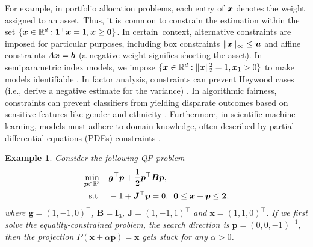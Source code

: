 \documentclass[aos]{imsart}
\numberwithin{equation}{section}
\theoremstyle{plain}
\newtheorem{example}{Example}
\begin{document}
For example, in portfolio allocation problems, each entry of ${\boldsymbol{x}}$ denotes the weight assigned to an asset. Thus, it is~common to constrain the estimation within the set $\{{\boldsymbol{x}}\in\mathbb{R}^d: {\boldsymbol{1}}^\top {\boldsymbol{x}} = 1, {\boldsymbol{x}}\geq {\boldsymbol 0}\}$. In certain~context, alternative constraints are imposed for particular purposes, including box constraints $\|{\boldsymbol{x}}\|_{\infty}\leq {\boldsymbol{u}}$ and affine constraints $A{\boldsymbol{x}} = {\boldsymbol{b}}$ \cite{Fan2007Variable, Fan2012Vast} (a negative weight signifies shorting the asset). In semiparametric index models, we impose $\{{\boldsymbol{x}}\in\mathbb{R}^d: \|{\boldsymbol{x}}\|_2^2=1, {\boldsymbol{x}}_1>0\}$ to make models identifiable \cite{Na2019High, Na2021High}. In factor analysis, constraints can prevent Heywood cases (i.e., derive a negative estimate for the variance) \cite{Shapiro1985Asymptotic}. In algorithmic fairness, constraints can prevent classifiers from yielding disparate outcomes based on sensitive features like gender and ethnicity \cite{Zafar2019Fairness}. Furthermore, in scientific machine learning, models must adhere to domain knowledge, often described by partial differential equations (PDEs) constraints \cite{Cuomo2022Scientific}.





\begin{example}
    Consider the following QP problem
    \begin{equation*}
        \begin{split}
            \min_{\bm{p} \in \mathbb{R}^{3}} & \hspace{1em} \bm{g}^{\top} \bm{p} + \frac{1}{2} \bm{p}^{\top} \bm{B} \bm{p},\\
            \text{s.t.} & \hspace{1em} -1 + \bm{J}^{\top} \bm{p} = 0, \hspace{0.5em} \bm{0} \leq \bm{x} + \bm{p} \leq \bm{2},
        \end{split}
    \end{equation*}
    where $\bm{g} = (1,-1,0)^{\top}$, $\bm{B} = \bm{I}_3$, $\bm{J} = (1,-1,1)^{\top}$ and $\bm{x} = (1, 1, 0)^{\top}$. If we first solve the equality-constrained problem, the search direction is $\bm{p} = (0,0,-1)^{-1}$, then the projection $P(\bm{x}+\alpha \bm{p}) = \bm{x}$ gets stuck for any $\alpha > 0$.
\end{example}
\end{document}

